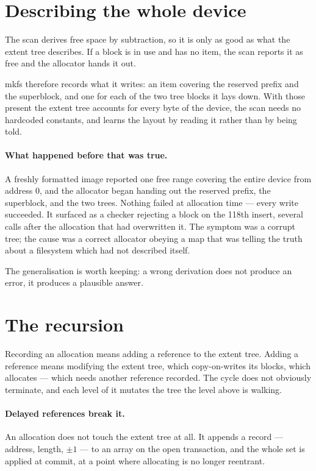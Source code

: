 \section{Describing the whole device}

The scan derives free space by subtraction, so it is only as good as what the
extent tree describes. If a block is in use and has no item, the scan reports
it as free and the allocator hands it out.

mkfs therefore records what it writes: an item covering the reserved prefix and
the superblock, and one for each of the two tree blocks it lays down. With
those present the extent tree accounts for every byte of the device, the scan
needs no hardcoded constants, and  learns the layout by reading it
rather than by being told.

\paragraph{What happened before that was true.} A freshly formatted image
reported one free range covering the entire device from address 0, and the
allocator began handing out the reserved prefix, the superblock, and the two
trees. Nothing failed at allocation time --- every write succeeded. It surfaced
as a checker rejecting a block on the 118th insert, several calls after the
allocation that had overwritten it. The symptom was a corrupt tree; the cause
was a correct allocator obeying a map that was telling the truth about a
filesystem which had not described itself.

The generalisation is worth keeping: a wrong derivation does not produce an
error, it produces a plausible answer.


\section{The recursion}

Recording an allocation means adding a reference to the extent tree. Adding a
reference means modifying the extent tree, which copy-on-writes its blocks,
which allocates --- which needs another reference recorded. The cycle does not
obviously terminate, and each level of it mutates the tree the level above is
walking.

\paragraph{Delayed references break it.} An allocation does not touch the
extent tree at all. It appends a record --- address, length, $\pm 1$ --- to an
array on the open transaction, and the whole set is applied at commit, at a
point where allocating is no longer reentrant.

